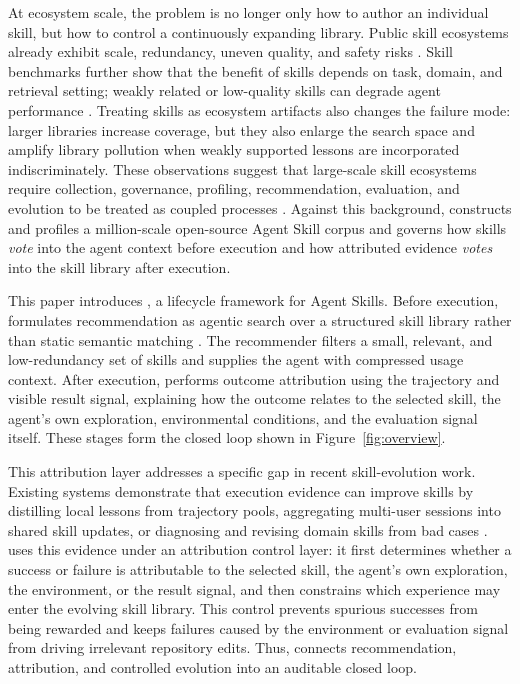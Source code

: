 At ecosystem scale, the problem is no longer only how to author an individual skill, but how to control a continuously expanding library. Public skill ecosystems already exhibit scale, redundancy, uneven quality, and safety risks \citep{ling2026agent}. Skill benchmarks further show that the benefit of skills depends on task, domain, and retrieval setting; weakly related or low-quality skills can degrade agent performance \citep{li2026skillsbench,liu2026well}. Treating skills as ecosystem artifacts also changes the failure mode: larger libraries increase coverage, but they also enlarge the search space and amplify library pollution when weakly supported lessons are incorporated indiscriminately. These observations suggest that large-scale skill ecosystems require collection, governance, profiling, recommendation, evaluation, and evolution to be treated as coupled processes \citep{li2026organizing,zheng2026skillrouter}. Against this background, \ours constructs and profiles a million-scale open-source Agent Skill corpus and governs how skills \textcolor{memblue}{\textit{vote}} into the agent context before execution and how attributed evidence \textcolor{memblue}{\textit{votes}} into the skill library after execution.

This paper introduces \ours, a lifecycle framework for Agent Skills. Before execution, \ours formulates recommendation as agentic search over a structured skill library rather than static semantic matching \citep{li2026beyond}. The recommender filters a small, relevant, and low-redundancy set of skills and supplies the agent with compressed usage context. After execution, \ours performs outcome attribution using the trajectory and visible result signal, explaining how the outcome relates to the selected skill, the agent's own exploration, environmental conditions, and the evaluation signal itself. These stages form the closed loop shown in Figure~\ref{fig:overview}.

This attribution layer addresses a specific gap in recent skill-evolution work. Existing systems demonstrate that execution evidence can improve skills by distilling local lessons from trajectory pools, aggregating multi-user sessions into shared skill updates, or diagnosing and revising domain skills from bad cases \citep{ni2026trace2skill,ma2026skillclaw,liu2026skillforge}. \ours uses this evidence under an attribution control layer: it first determines whether a success or failure is attributable to the selected skill, the agent's own exploration, the environment, or the result signal, and then constrains which experience may enter the evolving skill library. This control prevents spurious successes from being rewarded and keeps failures caused by the environment or evaluation signal from driving irrelevant repository edits. Thus, \ours connects recommendation, attribution, and controlled evolution into an auditable closed loop.

